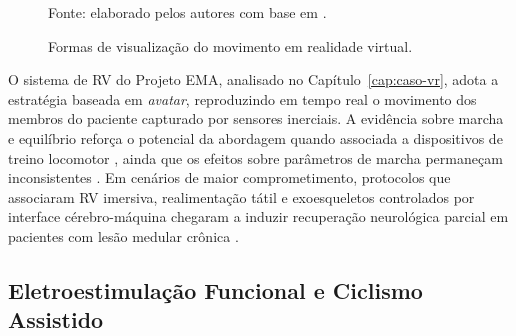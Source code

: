 \begin{figure}[H]
	\centering
	\caption{Formas de visualização do movimento em realidade virtual.}
	\label{fig:visualizacao}
	\vspace{6pt}

	\vspace{4pt}
	{\footnotesize Fonte: elaborado pelos autores com base em .}
\end{figure}

O sistema de RV do Projeto EMA, analisado no Capítulo~\ref{cap:caso-vr}, adota a estratégia
baseada em \emph{avatar}, reproduzindo em tempo real o movimento dos membros do paciente
capturado por sensores inerciais. A evidência sobre marcha e equilíbrio reforça o potencial
da abordagem quando associada a dispositivos de treino locomotor \cite{mirelman2016}, ainda
que os efeitos sobre parâmetros de marcha permaneçam inconsistentes \cite{lee2024}. Em
cenários de maior comprometimento, protocolos que associaram RV imersiva, realimentação
tátil e exoesqueletos controlados por interface cérebro-máquina chegaram a induzir
recuperação neurológica parcial em pacientes com lesão medular crônica \cite{donati2016}.

\subsection{Eletroestimulação Funcional e Ciclismo Assistido}
\label{sec:fes}

